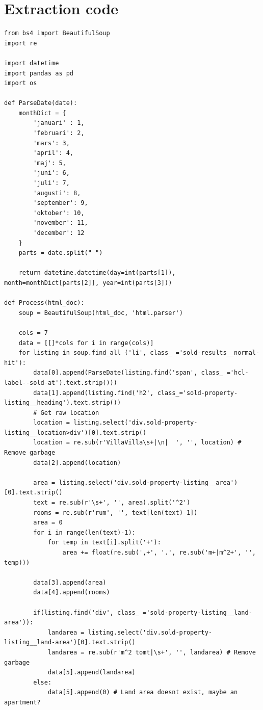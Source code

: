 \documentclass[a4paper]{article}
\begin{document}
\printbibliography
\appendix

\section*{Extraction code}
\label{app:excode}

\begin{lstlisting}
from bs4 import BeautifulSoup
import re

import datetime
import pandas as pd
import os

def ParseDate(date):
    monthDict = {
        'januari' : 1,
        'februari': 2,
        'mars': 3,
        'april': 4,
        'maj': 5,
        'juni': 6,
        'juli': 7,
        'augusti': 8,
        'september': 9,
        'oktober': 10,
        'november': 11,
        'december': 12
    }
    parts = date.split(" ")

    return datetime.datetime(day=int(parts[1]), month=monthDict[parts[2]], year=int(parts[3]))

def Process(html_doc):
    soup = BeautifulSoup(html_doc, 'html.parser')

    cols = 7
    data = [[]*cols for i in range(cols)]
    for listing in soup.find_all ('li', class_ ='sold-results__normal-hit'):
        data[0].append(ParseDate(listing.find('span', class_ ='hcl-label--sold-at').text.strip()))
        data[1].append(listing.find('h2', class_='sold-property-listing__heading').text.strip())
        # Get raw location
        location = listing.select('div.sold-property-listing__location>div')[0].text.strip()
        location = re.sub(r'VillaVilla\s+|\n|  ', '', location) # Remove garbage
        data[2].append(location)

        area = listing.select('div.sold-property-listing__area')[0].text.strip()
        text = re.sub(r'\s+', '', area).split('^2')
        rooms = re.sub(r'rum', '', text[len(text)-1])
        area = 0
        for i in range(len(text)-1):
            for temp in text[i].split('+'):
                area += float(re.sub(',+', '.', re.sub('m+|m^2+', '', temp)))

        data[3].append(area)
        data[4].append(rooms)
        
        if(listing.find('div', class_ ='sold-property-listing__land-area')):
            landarea = listing.select('div.sold-property-listing__land-area')[0].text.strip()
            landarea = re.sub(r'm^2 tomt|\s+', '', landarea) # Remove garbage
            data[5].append(landarea)
        else:
            data[5].append(0) # Land area doesnt exist, maybe an apartment?


\end{lstlisting}
\end{document}
